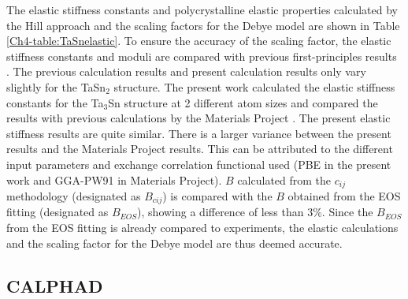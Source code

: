 The elastic stiffness constants and polycrystalline elastic properties calculated by the Hill approach and the scaling factors for the Debye model are shown in Table \ref{Ch4-table:TaSnelastic}. To ensure the accuracy of the scaling factor, the elastic stiffness constants and moduli are compared with previous first-principles results \cite{Jouault1967_611,Bergerhoff1983,Geller1955_165,Karlsruhe,MaterialsProject}. The previous calculation results and present calculation results only vary slightly for the TaSn$_2$ structure. The present work calculated the elastic stiffness constants for the Ta$_3$Sn structure at 2 different atom sizes and compared the results with previous calculations by the Materials Project \cite{Jouault1967_611,Bergerhoff1983,Geller1955_165,Karlsruhe,MaterialsProject}. The present elastic stiffness results are quite similar. There is a larger variance between the present results and the Materials Project results. This can be attributed to the different input parameters and exchange correlation functional used (PBE in the present work and GGA-PW91 in Materials Project). $B$ calculated from the $c_{ij}$ methodology (designated as $B_{cij}$) is compared with the $B$ obtained from the EOS fitting (designated as $B_{EOS}$), showing a difference of less than 3$\%$. Since the $B_{EOS}$ from the EOS fitting is already compared to experiments, the elastic calculations and the scaling factor for the Debye model are thus deemed accurate.

\subsection{CALPHAD}

